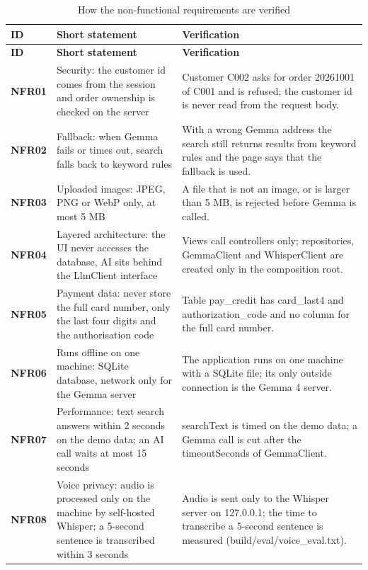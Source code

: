 \begin{longtable}{@{}P{1.3cm}P{5.0cm}P{8.7cm}@{}}
\caption{How the non-functional requirements are verified}\label{tab:nfrcheck}\\
\toprule
\small \textbf{ID} & \small \textbf{Short statement} & \small \textbf{Verification}\\
\midrule
\endfirsthead
\toprule
\small \textbf{ID} & \small \textbf{Short statement} & \small \textbf{Verification}\\
\midrule
\endhead
\bottomrule
\endlastfoot
\small \textbf{NFR01} & \small Security: the customer id comes from the session and order ownership is checked on the server & \small Customer C002 asks for order 20261001 of C001 and is refused; the customer id is never read from the request body.\\
\small \textbf{NFR02} & \small Fallback: when Gemma fails or times out, search falls back to keyword rules & \small With a wrong Gemma address the search still returns results from keyword rules and the page says that the fallback is used.\\
\small \textbf{NFR03} & \small Uploaded images: JPEG, PNG or WebP only, at most 5 MB & \small A file that is not an image, or is larger than 5 MB, is rejected before Gemma is called.\\
\small \textbf{NFR04} & \small Layered architecture: the UI never accesses the database, AI sits behind the LlmClient interface & \small Views call controllers only; repositories, GemmaClient and WhisperClient are created only in the composition root.\\
\small \textbf{NFR05} & \small Payment data: never store the full card number, only the last four digits and the authorisation code & \small Table pay\_credit has card\_last4 and authorization\_code and no column for the full card number.\\
\small \textbf{NFR06} & \small Runs offline on one machine: SQLite database, network only for the Gemma server & \small The application runs on one machine with a SQLite file; its only outside connection is the Gemma 4 server.\\
\small \textbf{NFR07} & \small Performance: text search answers within 2 seconds on the demo data; an AI call waits at most 15 seconds & \small searchText is timed on the demo data; a Gemma call is cut after the timeoutSeconds of GemmaClient.\\
\small \textbf{NFR08} & \small Voice privacy: audio is processed only on the machine by self-hosted Whisper; a 5-second sentence is transcribed within 3 seconds & \small Audio is sent only to the Whisper server on 127.0.0.1; the time to transcribe a 5-second sentence is measured (build/eval/voice\_eval.txt).\\

\end{longtable}

